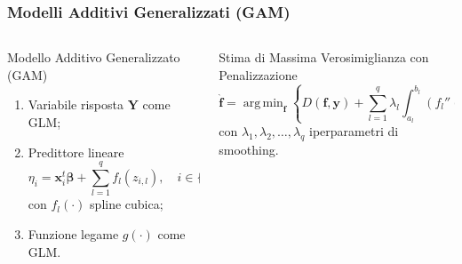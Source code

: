 \documentclass[pdf, aspectratio=169]{beamer}\usepackage[]{graphicx}\usepackage[]{color}
\DeclareMathOperator*{\argmin}{arg\,min}  %
\theoremstyle{definition}
\begin{document}
\begin{frame}
\frametitle{Modelli Additivi Generalizzati (GAM)}

\fontsize{9pt}{11pt}\selectfont

\begin{columns}[T]
\begin{column}{0.5\linewidth}
  \begin{block}{Modello Additivo Generalizzato (GAM)}
    \begin{enumerate}
      \item Variabile risposta $\boldsymbol{Y}$ come GLM;
      \item Predittore lineare
      $$
      \eta_i = \boldsymbol{x}_i^t \boldsymbol{\beta} + \sum_{l=1}^{q}{f_l(z_{i,l})}, \quad i\in\{1,2,\dots,n\}
      $$
      con $f_l(\cdot)$ spline cubica;
      \item Funzione legame $g(\cdot)$ come GLM.
    \end{enumerate}
  \end{block}
\end{column}

\begin{column}{0.5\linewidth}
  \begin{block}{Stima di Massima Verosimiglianza con Penalizzazione}
    $$
    \boldsymbol{\hat{f}} = \argmin_{\boldsymbol{f}}
    {\left\{
      D(\boldsymbol{f}, \boldsymbol{y})
        + \sum_{l=1}^{q}{
          \lambda_l \int_{a_l}^{b_l}{\left( f_l''(x_l) \right)^2 dx}
        }
    \right\}
    }
    $$
    con $\lambda_1, \lambda_2, \dots, \lambda_q$ iperparametri di smoothing.
  \end{block}
\end{column}

\end{columns}

\end{frame}
\end{document}
